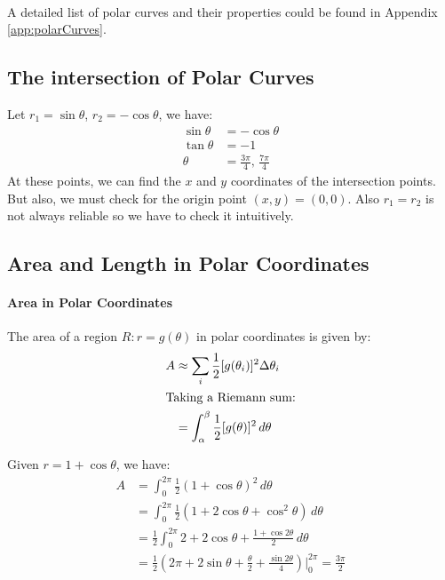 \documentclass[11pt]{article}
\begin{document}
\paragraph{} \label{sec:polar} A detailed list of polar curves and their properties could be found in Appendix \ref{app:polarCurves}. 
\subsection{The intersection of Polar Curves}
\begin{example}
    Let $r_1 = \sin \theta$, $r_2 = -\cos \theta$, we have:
    \begin{align*}
        \sin \theta &= -\cos \theta \\
        \tan \theta &= -1 \\
        \theta &= \frac{3\pi}{4},\, \frac{7\pi}{4}
    \end{align*}
    At these points, we can find the $x$ and $y$ coordinates of the intersection points. But also, we must check for the origin point $(x,y) = (0,0)$. Also $r_1 = r_2$ is not always reliable so we have to check it intuitively.
\end{example}
\subsection{Area and Length in Polar Coordinates}
\paragraph{Area in Polar Coordinates} The area of a region $R: r = g(\theta)$ in polar coordinates is given by:
\begin{align}
    A &\approx \sum_{i} \frac{1}{2} [g(\theta_i)]^2 \Delta \theta_i \nonumber \\
    \intertext{Taking a Riemann sum:}
    &= \int_{\alpha}^{\beta} \frac{1}{2} [g(\theta)]^2 \, d\theta
\end{align}
\begin{example}
    Given $r = 1 + \cos \theta$, we have:
    \begin{align*}
        A &= \int_0^{2\pi} \frac{1}{2} (1 + \cos \theta)^2 \, d\theta \\
        &= \int_0^{2\pi} \frac{1}{2} (1 + 2\cos \theta + \cos^2 \theta) \, d\theta \\
        &= \frac{1}{2}\int_0^{2\pi} 2 + 2\cos \theta + \frac{1 + \cos 2\theta}{2} \, d\theta \\
        &= \frac{1}{2}\left(2\pi + 2\sin \theta + \frac{\theta}{2} + \frac{\sin 2\theta}{4}\right) \Big|_0^{2\pi}= \frac{3\pi}{2}
    \end{align*}
\end{example}
\end{document}

